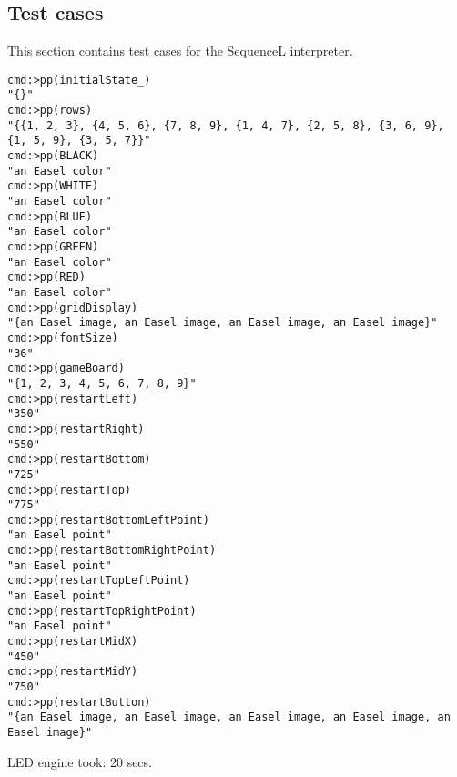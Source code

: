 \documentclass{../lib}
\begin{document}
\begin{ledDef}
\end{ledDef}

\begin{ledCmnt}
\section{Test cases}

This section contains test cases for the SequenceL interpreter.

\begin{verbatim}
cmd:>pp(initialState_)
"{}"
cmd:>pp(rows)
"{{1, 2, 3}, {4, 5, 6}, {7, 8, 9}, {1, 4, 7}, {2, 5, 8}, {3, 6, 9}, {1, 5, 9}, {3, 5, 7}}"
cmd:>pp(BLACK)
"an Easel color"
cmd:>pp(WHITE)
"an Easel color"
cmd:>pp(BLUE)
"an Easel color"
cmd:>pp(GREEN)
"an Easel color"
cmd:>pp(RED)
"an Easel color"
cmd:>pp(gridDisplay)
"{an Easel image, an Easel image, an Easel image, an Easel image}"
cmd:>pp(fontSize)
"36"
cmd:>pp(gameBoard)
"{1, 2, 3, 4, 5, 6, 7, 8, 9}"
cmd:>pp(restartLeft)
"350"
cmd:>pp(restartRight)
"550"
cmd:>pp(restartBottom)
"725"
cmd:>pp(restartTop)
"775"
cmd:>pp(restartBottomLeftPoint)
"an Easel point"
cmd:>pp(restartBottomRightPoint)
"an Easel point"
cmd:>pp(restartTopLeftPoint)
"an Easel point"
cmd:>pp(restartTopRightPoint)
"an Easel point"
cmd:>pp(restartMidX)
"450"
cmd:>pp(restartMidY)
"750"
cmd:>pp(restartButton)
"{an Easel image, an Easel image, an Easel image, an Easel image, an Easel image}"
\end{verbatim}

LED engine took: 20 secs.
\end{ledCmnt}
\end{document}
